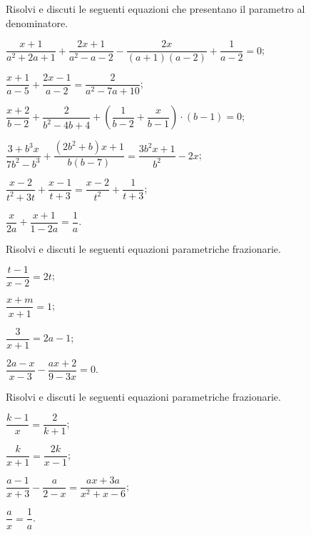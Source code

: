 \begin{esercizio}[\Ast]
\label{ese:20.46}
Risolvi e discuti le seguenti equazioni che presentano il parametro al denominatore.
\begin{enumeratea}
 \item $\dfrac{x+1}{a^{2}+2a+1}+\dfrac{2x+1}{a^{2}-a-2}-\dfrac{2x}{(a+1)(a-2)}+\dfrac{1}{a-2}=0$;
 \item $\dfrac{x+1}{a-5}+\dfrac{2x-1}{a-2}=\dfrac{2}{a^{2}-7a+10}$;
 \item $\dfrac{x+2}{b-2}+\dfrac{2}{b^{2}-4b+4}+\left(\dfrac{1}{b-2}+\dfrac{x}{b-1}\right)\cdot (b-1)=0$;
 \item $\dfrac{3+b^{3}x}{7b^{2}-b^{3}}+\dfrac{(2b^{2}+b)x+1}{b(b-7)}=\dfrac{3b^{2}x+1}{b^{2}}-2x$;
 \item $\dfrac{x-2}{t^{2}+3t}+\dfrac{x-1}{t+3}=\dfrac{x-2}{t^{2}}+\dfrac{1}{t+3}$;
 \item $\dfrac{x}{2a}+\dfrac{x+1}{1-2a}=\dfrac{1}{a}$.
\end{enumeratea}
\end{esercizio}

\begin{esercizio}[\Ast]
\label{ese:20.47}
Risolvi e discuti le seguenti equazioni parametriche frazionarie.
\begin{multicols}{2}
\begin{enumeratea}
 \item $\dfrac{t-1}{x-2}=2t$;
 \item $\dfrac{x+m}{x+1}=1$;
 \item $\dfrac{3}{x+1}=2a-1$;
 \item $\dfrac{2a-x}{x-3}-\dfrac{ax+2}{9-3x}=0$.
\end{enumeratea}
\end{multicols}
\end{esercizio}

\begin{esercizio}[\Ast]
\label{ese:20.48}
Risolvi e discuti le seguenti equazioni parametriche frazionarie.
\begin{multicols}{2}
\begin{enumeratea}
 \item $\dfrac{k-1}{x}=\dfrac{2}{k+1}$;
 \item $\dfrac{k}{x+1}=\dfrac{2k}{x-1}$;
 \item $\dfrac{a-1}{x+3}-\dfrac{a}{2-x}=\dfrac{ax+3a}{x^{2}+x-6}$;
 \item $\dfrac{a}{x}=\dfrac{1}{a}$.
\end{enumeratea}
\end{multicols}
\end{esercizio}

